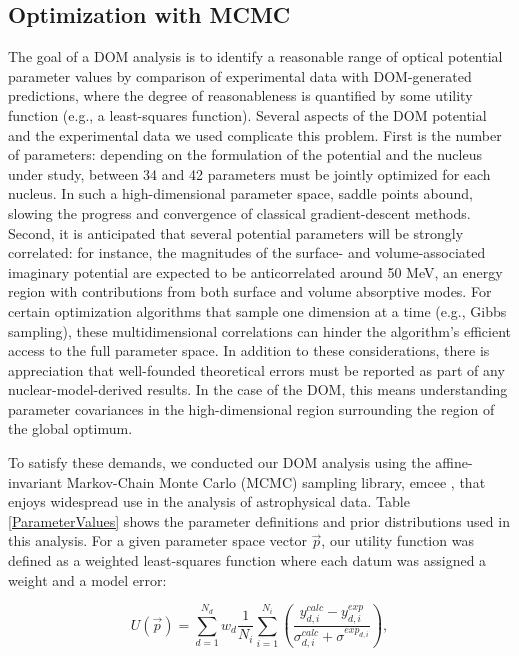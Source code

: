 \documentclass[twocolumn,secnumarabic,amssymb, nobibnotes, aps, prl,
superscriptaddress, nobalancelastpage]{revtex4}
\begin{document}
\subsection{Optimization with MCMC}
The goal of a DOM analysis is to identify a
reasonable range of optical potential parameter values by comparison of experimental data with
DOM-generated predictions, where the degree of reasonableness is quantified by
some utility function (e.g., a least-squares function).
Several aspects of the DOM potential and the experimental
data we used complicate this problem. First is the number of
parameters: depending on the formulation of the potential and the nucleus under
study, between 34 and 42 parameters must be jointly optimized for each nucleus.
In such a high-dimensional parameter space, saddle points abound, slowing
the progress and convergence of classical gradient-descent methods. Second, it is
anticipated that several potential parameters will be strongly correlated: for
instance, the magnitudes of the surface- and volume-associated imaginary
potential are expected to be anticorrelated around 50 MeV, an energy region with
contributions from both surface and volume absorptive modes. For certain
optimization algorithms that sample one dimension at a time (e.g., Gibbs
sampling), these multidimensional correlations can hinder the algorithm's
efficient access to the full parameter space. In addition to these
considerations, there is appreciation that well-founded theoretical errors must
be reported as part of any nuclear-model-derived results. In the case of the DOM,
this means understanding parameter covariances in the high-dimensional region
surrounding the region of the global optimum.

To satisfy these demands, we conducted our DOM analysis using the affine-invariant
Markov-Chain Monte Carlo (MCMC) sampling library, emcee \cite{emcee}, that 
enjoys widespread use in the analysis of astrophysical data. Table \ref{ParameterValues} 
shows the parameter definitions and prior distributions used in this analysis.
For a given parameter space vector $\vec{p}$, our utility function was defined as
a weighted least-squares function where each datum was assigned a weight and a
model error:

\begin{equation} \label{UtilityFunction}
    U(\vec{p}) = \sum_{d=1}^{N_{d}} w_{d} \frac{1}{N_{i}} \sum_{i=1}^{N_{i}}
    \left(\frac{y^{calc}_{d,i}-y^{exp}_{d,i}}{\sigma^{calc}_{d,i}+\sigma^{exp_{d,i}}}\right),
\end{equation}
\end{document}
